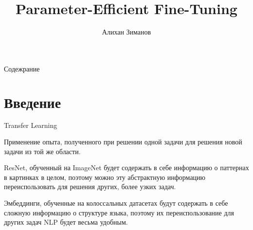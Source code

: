 \documentclass[9pt]{beamer}
\title[\textbf{PEFT}]{Parameter-Efficient Fine-Tuning} %
\author[\textbf{Алихан Зиманов}]
{Алихан Зиманов} %
\institute[\textbf{ПМИ ФКН НИУ ВШЭ}] %
{Факультет компьютерных наук\\
НИУ ВШЭ %
}
\begin{document}
{
\beamertemplatenavigationsymbolsempty
\begin{frame}[plain]
\titlepage
\end{frame}
}

{
\beamertemplatenavigationsymbolsempty
{}
{ }
\begin{frame}{Содежрание} 
\tableofcontents 
\end{frame} 
}

\addtocounter{framenumber}{-2}


\section{Введение}


\begin{frame}{Transfer Learning}

    \begin{definition}
        Применение опыта, полученного при решении одной задачи для решения новой задачи из той же области.
    \end{definition}

    \begin{example}
        ResNet, обученный на ImageNet будет содержать в себе информацию о паттернах в картинках в целом, поэтому можно эту абстрактную информацию переиспользовать для решения других, более узких задач.
    \end{example}

    \begin{example}
        Эмбеддинги, обученные на колоссальных датасетах будут содержать в себе сложную информацию о структуре языка, поэтому их переиспользование для других задач NLP будет весьма удобным.
    \end{example}

\end{frame}
\end{document}
